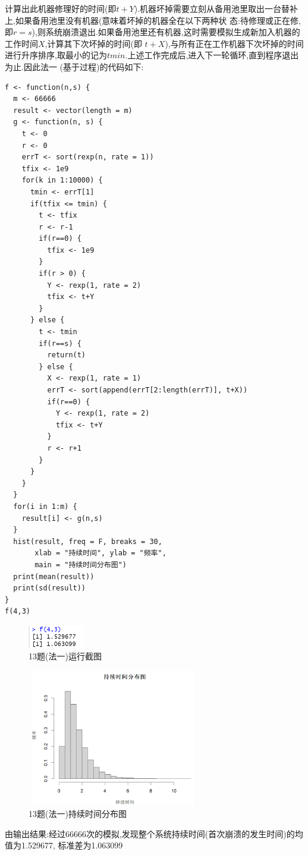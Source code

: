 \documentclass{book}
\begin{document}
计算出此机器修理好的时间(即$t+Y$).机器坏掉需要立刻从备用池里取出一台替补上,如果备用池里没有机器(意味着坏掉的机器全在以下两种状
态:待修理或正在修,即$r=s$),则系统崩溃退出.如果备用池里还有机器,这时需要模拟生成新加入机器的工作时间$X$,计算其下次坏掉的时间(即
$t+X$),与所有正在工作机器下次坏掉的时间进行升序排序,取最小的记为$tmin$.上述工作完成后,进入下一轮循环,直到程序退出为止.因此法一
(基于过程)的代码如下:
\lstset{language = R}
\begin{lstlisting}
f <- function(n,s) {
  m <- 66666
  result <- vector(length = m) 
  g <- function(n, s) {
    t <- 0
    r <- 0
    errT <- sort(rexp(n, rate = 1))
    tfix <- 1e9
    for(k in 1:10000) {
      tmin <- errT[1]
      if(tfix <= tmin) {
        t <- tfix   
        r <- r-1
        if(r==0) {
          tfix <- 1e9
        }
        if(r > 0) {
          Y <- rexp(1, rate = 2)
          tfix <- t+Y
        }
      } else {  
        t <- tmin 
        if(r==s) {
          return(t)
        } else {
          X <- rexp(1, rate = 1)
          errT <- sort(append(errT[2:length(errT)], t+X))
          if(r==0) {
            Y <- rexp(1, rate = 2)
            tfix <- t+Y
          } 
          r <- r+1
        }
      }
    }
  }
  for(i in 1:m) {
    result[i] <- g(n,s)
  }
  hist(result, freq = F, breaks = 30, 
       xlab = "持续时间", ylab = "频率", 
       main = "持续时间分布图")
  print(mean(result))
  print(sd(result))
}
f(4,3)
\end{lstlisting}
\begin{figure}[H]
    \centering
    \includegraphics*[height = 1cm, width = 2.5cm]{gramFile/十三题/13题(法一)运行截图.PNG}
    \caption{13题(法一)运行截图}
\end{figure}
\begin{figure}[H]
    \centering
    \includegraphics*[height = 6cm, width = 7.5cm]{gramFile/十三题/13题(法一)持续时间分布图.PNG}
    \caption{13题(法一)持续时间分布图}
\end{figure}
\noindent
由输出结果:经过66666次的模拟,发现整个系统持续时间(首次崩溃的发生时间)的均值为1.529677,
标准差为1.063099 \\
\end{document}
